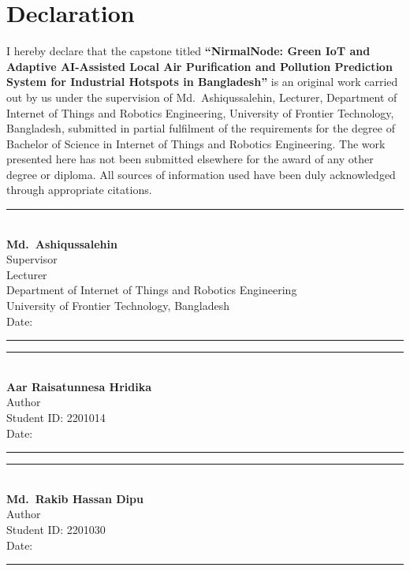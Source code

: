\chapter*{Declaration}

I hereby declare that the capstone titled 
\textbf{``NirmalNode: Green IoT and Adaptive AI-Assisted Local Air Purification and Pollution Prediction System for Industrial Hotspots in Bangladesh''} 
is an original work carried out by us under the supervision of Md.\ Ashiqussalehin, 
Lecturer, Department of Internet of Things and Robotics Engineering, 
University of Frontier Technology, Bangladesh, submitted in partial fulfilment 
of the requirements for the degree of Bachelor of Science in Internet of Things 
and Robotics Engineering. The work presented here has not been submitted elsewhere 
for the award of any other degree or diploma. All sources of information used have 
been duly acknowledged through appropriate citations.

\vspace{2.5cm}

\begin{center}
    \rule{0.32\textwidth}{0.4pt}\\[0.2cm]
    \textbf{Md.\ Ashiqussalehin}\\
    Supervisor\\
    Lecturer\\
    Department of Internet of Things and Robotics Engineering\\
    University of Frontier Technology, Bangladesh\\[0.2cm]
    Date: \rule{3cm}{0.4pt}
\end{center}

\vspace{1.5cm}

\begin{center}
\begin{minipage}[t]{0.42\textwidth}
    \centering
    \rule{\textwidth}{0.4pt}\\[0.2cm]
    \textbf{Aar Raisatunnesa Hridika}\\
    Author\\
    Student ID: 2201014\\
    Date: \rule{3cm}{0.4pt}
\end{minipage}
\hfill
\begin{minipage}[t]{0.42\textwidth}
    \centering
    \rule{\textwidth}{0.4pt}\\[0.2cm]
    \textbf{Md.\ Rakib Hassan Dipu}\\
    Author\\
    Student ID: 2201030\\
    Date: \rule{3cm}{0.4pt}
\end{minipage}
\end{center}